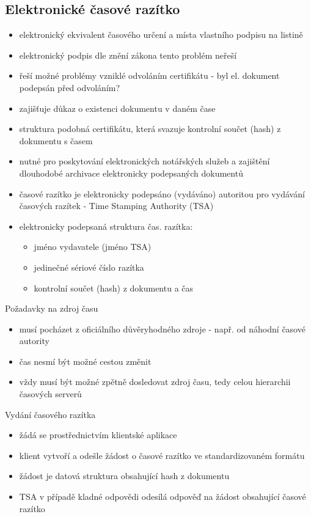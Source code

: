 \subsection{Elektronické časové razítko}
\begin{itemize}
    \item elektronický ekvivalent časového určení a místa vlastního podpisu na listině
    \item elektronický podpis dle znění zákona tento problém neřeší
    \item řeší možné problémy vzniklé odvoláním certifikátu - byl el. dokument podepsán před odvoláním?
    \item zajišťuje důkaz o existenci dokumentu v daném čase
    \item struktura podobná certifikátu, která svazuje kontrolní součet (hash) z dokumentu s časem \\
    \item nutné pro poskytování elektronických notářských služeb a zajištění dlouhodobé archivace elektronicky podepsaných dokumentů
    \item časové razítko je elektronicky podepsáno (vydáváno) autoritou pro vydávání časových razítek - Time Stamping Authority (TSA)
    \item elektronicky podepsaná struktura čas. razítka:
    \begin{itemize}
        \item jméno vydavatele (jméno TSA)
        \item jedinečné sériové číslo razítka
        \item kontrolní součet (hash) z dokumentu a čas \\
    \end{itemize}
\end{itemize}
Požadavky na zdroj času
\begin{itemize}
    \item musí pocházet z oficiálního důvěryhodného zdroje - např. od náhodní časové autority
    \item čas nesmí být možné cestou změnit
    \item vždy musí být možné zpětně dosledovat zdroj času, tedy celou hierarchii časových serverů \\
\end{itemize}
Vydání časového razítka
\begin{itemize}
    \item žádá se prostřednictvím klientské aplikace
    \item klient vytvoří a odešle žádost o časové razítko ve standardizovaném formátu 
    \item žádost je datová struktura obsahující hash z dokumentu
    \item TSA v případě kladné odpovědi odesílá odpověď na žádost obsahující časové razítko
\end{itemize}


